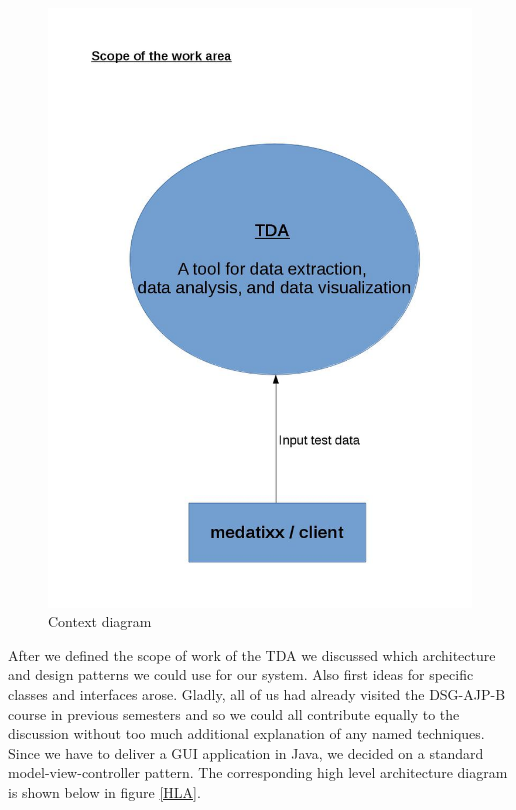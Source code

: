 \begin{figure}[h]
\begin{center}
\includegraphics[scale=0.2]{pics/Scope_of_Work_Context_Diagram_v2.jpg}
\caption{Context diagram} 
\label{Scope}
\end{center}
\end{figure}

After we defined the scope of work of the TDA we discussed which architecture and design patterns we could use for our system. Also first ideas for specific classes and interfaces arose. Gladly, all of us had already visited the DSG-AJP-B course in previous semesters and so we could all contribute equally to the discussion without too much additional explanation of any named techniques. Since we have to deliver a GUI application in Java, we decided on a standard model-view-controller pattern. The corresponding high level architecture diagram is shown below in figure \ref{HLA}. \\

